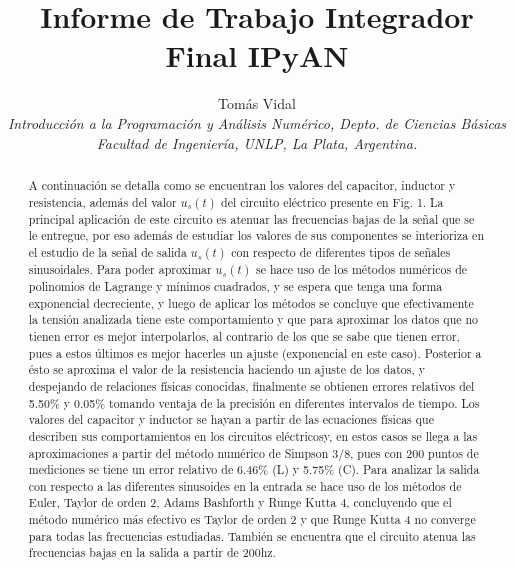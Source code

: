 \documentclass[letterpaper, 10 pt, conference]{ieeeconf}  %
\title{\LARGE \bf
Informe de Trabajo Integrador Final IPyAN
}
\author{Tomás Vidal\\ %
{\it Introducci\'on a la Programaci\'on y An\'alisis Num\'erico, Depto. de Ciencias B\'asicas}\\  {\it Facultad de Ingenier\'ia, UNLP, La Plata, Argentina.}}                                            %
\begin{document}
\maketitle
\thispagestyle{empty}
\pagestyle{empty}

\begin{abstract}

    A continuaci\'on se detalla como se encuentran los valores del capacitor, inductor y resistencia, adem\'as del valor $u_{s}(t)$ del circuito el\'ectrico presente en Fig. 1. La principal aplicaci\'on de este circuito es atenuar las frecuencias bajas de la señal que se le entregue, por eso adem\'as de estudiar los valores de sus componentes se interioriza en el estudio de la señal de salida $u_{s}(t)$ con respecto de diferentes tipos de señales sinusoidales.
    Para poder aproximar $u_{s}(t)$ se hace uso de los m\'etodos num\'ericos de polinomios de Lagrange y m\'inimos cuadrados, y se espera que tenga una forma exponencial decreciente, y luego de aplicar los m\'etodos se concluye que efectivamente la tensi\'on analizada tiene este comportamiento y que para aproximar los datos que no tienen error es mejor interpolarlos, al contrario de los que se sabe que tienen error, pues a estos \'ultimos es mejor hacerles un ajuste (exponencial en este caso).
    Posterior a \'esto se aproxima el valor de la resistencia haciendo un ajuste de los datos, y despejando de relaciones f\'isicas conocidas, finalmente se obtienen errores relativos del 5.50\% y 0.05\% tomando ventaja de la precisi\'on en diferentes intervalos de tiempo. Los valores del capacitor y inductor se hayan a partir de las ecuaciones f\'isicas que describen sus comportamientos en los circuitos el\'ectricosy, en estos casos se llega a las aproximaciones a partir del m\'etodo num\'erico de Simpson 3/8, pues con 200 puntos de mediciones se tiene un error relativo de 6.46\% (L) y 5.75\% (C).
    Para analizar la salida con respecto a las diferentes sinusoides en la entrada se hace uso de los m\'etodos de Euler, Taylor de orden 2, Adams Bashforth y Runge Kutta 4, concluyendo que el m\'etodo num\'erico m\'as efectivo es Taylor de orden 2 y que Runge Kutta 4 no converge para todas las frecuencias estudiadas. Tambi\'en se encuentra que el circuito atenua las frecuencias bajas en la salida a partir de 200hz.

\end{abstract}


\end{document}
